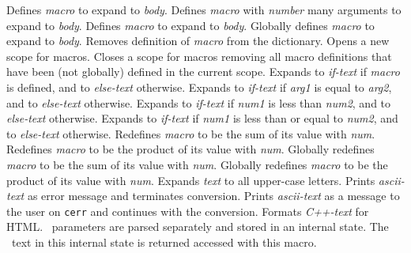 \documentclass[12pt]{article}
\begin{document}
\begin{description}
    Defines {\em macro\/} to expand to {\em body}.
    Defines {\em macro\/} with {\em number\/} many arguments to expand to
    {\em body}.
    Defines {\em macro\/} to expand to {\em body}.
    Globally defines {\em macro\/} to expand to {\em body}.
    Removes definition of {\em macro\/} from the dictionary.
    Opens a new scope for macros.
    Closes a scope for macros removing all macro definitions that 
    have been (not globally) defined in the current scope.
    Expands to {\em if-text\/} if {\em macro\/} is defined, and to
    {\em else-text\/} otherwise.
    Expands to {\em if-text\/} if {\em arg1\/} is equal to {\em arg2}, and to
    {\em else-text\/} otherwise.
    Expands to {\em if-text\/} if {\em num1\/} is less than {\em num2}, and to
    {\em else-text\/} otherwise.
    Expands to {\em if-text\/} if {\em num1\/} is less than or equal 
    to {\em num2}, and to {\em else-text\/} otherwise.
    Redefines {\em macro\/} to be the sum of its value with {\em num}.
    Redefines {\em macro\/} to be the product of its value with {\em num}.
    Globally redefines {\em macro\/} to be the sum of its value with {\em num}.
    Globally redefines {\em macro\/} to be the product of its value 
    with {\em num}.
    Expands {\em text\/} to all upper-case letters.
    Prints {\em ascii-text\/} as error message and terminates conversion.
    Prints {\em ascii-text\/} as a message to the user on {\tt cerr}
    and continues with the conversion.
    Formats {\em C++-text} for HTML.
    \CC\ parameters are parsed separately and stored in an internal state.
    The \CC\ text in this internal state is returned accessed with this macro.

\end{description}
\end{document}
